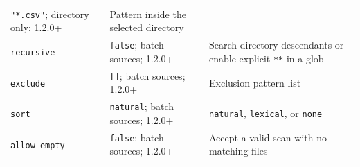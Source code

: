 \documentclass[
  10pt,
  a4paper,
  oneside]{scrreprt}
\begin{document}
\begin{longtable}[]{@{}lll@{}}
\begin{minipage}[t]{0.30\columnwidth}
\texttt{"*.csv"}; directory only; 1.2.0+\strut
\end{minipage} & \begin{minipage}[t]{0.30\columnwidth}\raggedright
Pattern inside the selected directory\strut
\end{minipage}\tabularnewline
\begin{minipage}[t]{0.30\columnwidth}\raggedright
\texttt{recursive}\strut
\end{minipage} & \begin{minipage}[t]{0.30\columnwidth}\raggedright
\texttt{false}; batch sources; 1.2.0+\strut
\end{minipage} & \begin{minipage}[t]{0.30\columnwidth}\raggedright
Search directory descendants or enable explicit \texttt{**} in a
glob\strut
\end{minipage}\tabularnewline
\begin{minipage}[t]{0.30\columnwidth}\raggedright
\texttt{exclude}\strut
\end{minipage} & \begin{minipage}[t]{0.30\columnwidth}\raggedright
\texttt{{[}{]}}; batch sources; 1.2.0+\strut
\end{minipage} & \begin{minipage}[t]{0.30\columnwidth}\raggedright
Exclusion pattern list\strut
\end{minipage}\tabularnewline
\begin{minipage}[t]{0.30\columnwidth}\raggedright
\texttt{sort}\strut
\end{minipage} & \begin{minipage}[t]{0.30\columnwidth}\raggedright
\texttt{natural}; batch sources; 1.2.0+\strut
\end{minipage} & \begin{minipage}[t]{0.30\columnwidth}\raggedright
\texttt{natural}, \texttt{lexical}, or \texttt{none}\strut
\end{minipage}\tabularnewline
\begin{minipage}[t]{0.30\columnwidth}\raggedright
\texttt{allow\_empty}\strut
\end{minipage} & \begin{minipage}[t]{0.30\columnwidth}\raggedright
\texttt{false}; batch sources; 1.2.0+\strut
\end{minipage} & \begin{minipage}[t]{0.30\columnwidth}\raggedright
Accept a valid scan with no matching files\strut
\end{minipage}\tabularnewline

\end{longtable}
\end{document}
